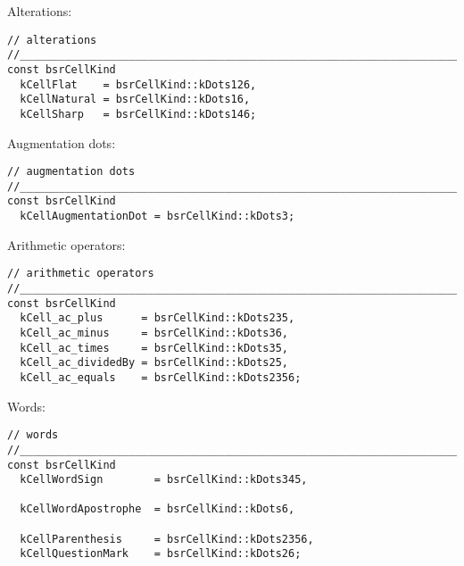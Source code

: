 Alterations:
\begin{lstlisting}[language=CPlusPlus]
// alterations
//______________________________________________________________________________
const bsrCellKind
  kCellFlat    = bsrCellKind::kDots126,
  kCellNatural = bsrCellKind::kDots16,
  kCellSharp   = bsrCellKind::kDots146;
\end{lstlisting}

Augmentation dots:
\begin{lstlisting}[language=CPlusPlus]
// augmentation dots
//______________________________________________________________________________
const bsrCellKind
  kCellAugmentationDot = bsrCellKind::kDots3;
\end{lstlisting}

Arithmetic operators:
\begin{lstlisting}[language=CPlusPlus]
// arithmetic operators
//______________________________________________________________________________
const bsrCellKind
  kCell_ac_plus      = bsrCellKind::kDots235,
  kCell_ac_minus     = bsrCellKind::kDots36,
  kCell_ac_times     = bsrCellKind::kDots35,
  kCell_ac_dividedBy = bsrCellKind::kDots25,
  kCell_ac_equals    = bsrCellKind::kDots2356;
\end{lstlisting}

Words:
\begin{lstlisting}[language=CPlusPlus]
// words
//______________________________________________________________________________
const bsrCellKind
  kCellWordSign        = bsrCellKind::kDots345,

  kCellWordApostrophe  = bsrCellKind::kDots6,

  kCellParenthesis     = bsrCellKind::kDots2356,
  kCellQuestionMark    = bsrCellKind::kDots26;
\end{lstlisting}

